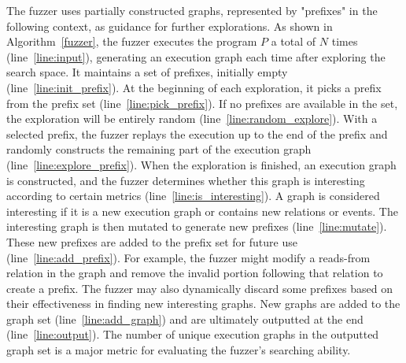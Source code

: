 The fuzzer uses partially constructed graphs, represented by "prefixes" in the following context, as guidance for further explorations. As shown in Algorithm~\ref{fuzzer}, the fuzzer executes the program $P$ a total of $N$ times (line~\ref{line:input}), generating an execution graph each time after exploring the search space. It maintains a set of prefixes, initially empty (line~\ref{line:init_prefix}). At the beginning of each exploration, it picks a prefix from the prefix set (line~\ref{line:pick_prefix}). If no prefixes are available in the set, the exploration will be entirely random (line~\ref{line:random_explore}). With a selected prefix, the fuzzer replays the execution up to the end of the prefix and randomly constructs the remaining part of the execution graph (line~\ref{line:explore_prefix}). When the exploration is finished, an execution graph is constructed, and the fuzzer determines whether this graph is interesting according to certain metrics (line~\ref{line:is_interesting}). A graph is considered interesting if it is a new execution graph or contains new relations or events. The interesting graph is then mutated to generate new prefixes (line~\ref{line:mutate}). These new prefixes are added to the prefix set for future use (line~\ref{line:add_prefix}). For example, the fuzzer might modify a reads-from relation in the graph and remove the invalid portion following that relation to create a prefix. The fuzzer may also dynamically discard some prefixes based on their effectiveness in finding new interesting graphs. New graphs are added to the graph set (line~\ref{line:add_graph}) and are ultimately outputted at the end (line~\ref{line:output}). The number of unique execution graphs in the outputted graph set is a major metric for evaluating the fuzzer's searching ability.




